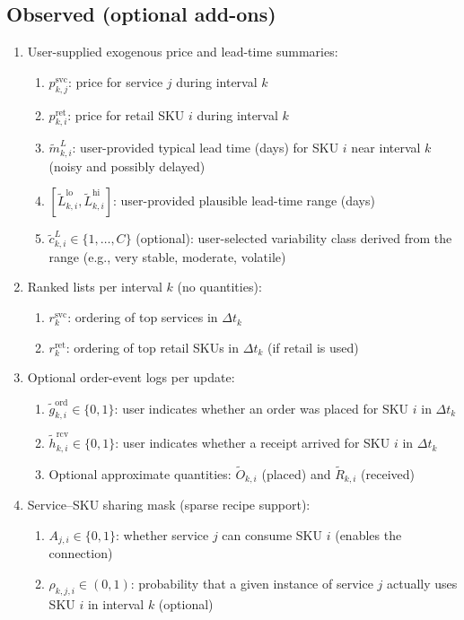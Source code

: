 \documentclass[11pt]{article}
\begin{document}
\subsection*{Observed (optional add-ons)}
\begin{enumerate}
  \item User-supplied exogenous price and lead-time summaries:
  \begin{enumerate}
    \item $p^{\mathrm{svc}}_{k,j}$: price for service $j$ during interval $k$
    \item $p^{\mathrm{ret}}_{k,i}$: price for retail SKU $i$ during interval $k$
    \item $\tilde m^L_{k,i}$: user-provided typical lead time (days) for SKU $i$ near interval $k$ (noisy and possibly delayed)
    \item $[\tilde L^{\mathrm{lo}}_{k,i},\tilde L^{\mathrm{hi}}_{k,i}]$: user-provided plausible lead-time range (days)
    \item $\tilde c^L_{k,i}\in\{1,\dots,C\}$ (optional): user-selected variability class derived from the range (e.g., very stable, moderate, volatile)
  \end{enumerate}

  \item Ranked lists per interval $k$ (no quantities):
  \begin{enumerate}
    \item $r^{\mathrm{svc}}_k$: ordering of top services in $\Delta t_k$
    \item $r^{\mathrm{ret}}_k$: ordering of top retail SKUs in $\Delta t_k$ (if retail is used)
  \end{enumerate}

  \item Optional order-event logs per update:
  \begin{enumerate}
    \item $\tilde g^{\mathrm{ord}}_{k,i} \in \{0,1\}$: user indicates whether an order was placed for SKU $i$ in $\Delta t_k$
    \item $\tilde h^{\mathrm{rcv}}_{k,i} \in \{0,1\}$: user indicates whether a receipt arrived for SKU $i$ in $\Delta t_k$
    \item Optional approximate quantities: $\tilde O_{k,i}$ (placed) and $\tilde R_{k,i}$ (received)
  \end{enumerate}

  \item Service--SKU sharing mask (sparse recipe support):
  \begin{enumerate}
    \item $A_{j,i} \in \{0,1\}$: whether service $j$ can consume SKU $i$ (enables the connection)
    \item $\rho_{k,j,i} \in (0,1)$: probability that a given instance of service $j$ actually uses SKU $i$ in interval $k$ (optional)
  \end{enumerate}


\end{enumerate}
\end{document}
